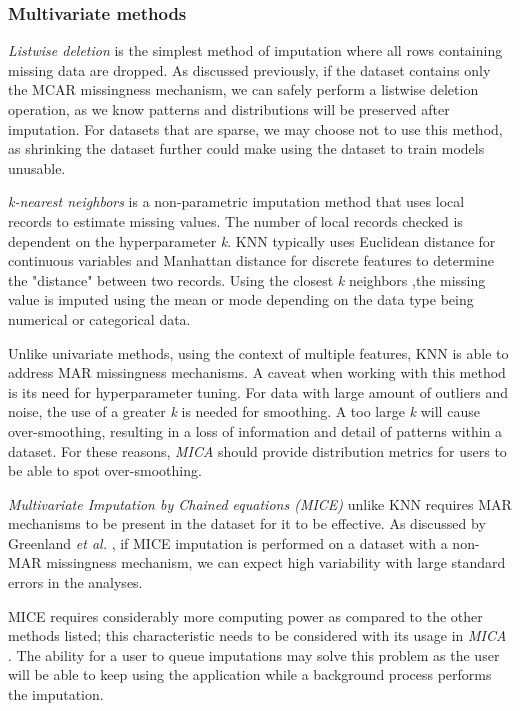 \documentclass[a4paper, 11pt]{article}
\newcommand{\etal}{\textit{et al. }}
\newcommand{\mica}{\textit{MICA }}
\begin{document}
\subsubsection{Multivariate methods} 
\textit{Listwise deletion} is the simplest method of imputation where all rows
containing missing data are dropped. As discussed previously, if the dataset
contains only the MCAR missingness mechanism, we can safely perform a listwise
deletion operation, as we know patterns and distributions will be preserved
after imputation. For datasets that are sparse, we may choose not to use this
method, as shrinking the dataset further could make using the dataset to train
models unusable.

\textit{k-nearest neighbors} is a non-parametric imputation method that uses
local records to estimate missing values. The number of local records checked
is dependent on the hyperparameter \textit{k}. KNN typically uses Euclidean
distance for continuous variables and Manhattan distance for discrete features
to determine the "distance" between two records. Using the closest \textit{k}
neighbors ,the missing value is imputed using the mean or mode depending on
the data type being numerical or categorical data.

Unlike univariate methods, using the context of multiple features, KNN is able
to address MAR missingness mechanisms. A caveat when working with this method
is its need for hyperparameter tuning. For data with large amount of outliers
and noise, the use of a greater \textit{k} is needed for smoothing. A too large
\textit{k} will cause over-smoothing, resulting in a loss of information and
detail of patterns within a dataset. For these reasons, \mica should provide
distribution metrics for users to be able to spot over-smoothing.

\textit{Multivariate Imputation by Chained equations (MICE)} unlike KNN
requires MAR mechanisms to be present in the dataset for it to be effective. As
discussed by Greenland \etal \cite{greenland_critical_1995}, if MICE imputation
is performed on a dataset with a non-MAR missingness mechanism, we can expect
high variability with large standard errors in the analyses. 

MICE requires considerably more computing power as compared to the other methods
listed; this characteristic needs to be considered with its usage in \mica. The
ability for a user to queue imputations may solve this problem as the user will
be able to keep using the application while a background process performs the
imputation.
\end{document}
